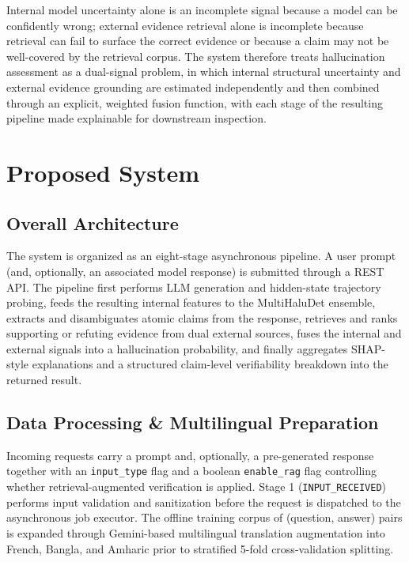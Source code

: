 \documentclass[conference]{IEEEtran}
\begin{document}
Internal model uncertainty alone is an incomplete signal because a model can be confidently wrong; external evidence retrieval alone is incomplete because retrieval can fail to surface the correct evidence or because a claim may not be well-covered by the retrieval corpus. The system therefore treats hallucination assessment as a dual-signal problem, in which internal structural uncertainty and external evidence grounding are estimated independently and then combined through an explicit, weighted fusion function, with each stage of the resulting pipeline made explainable for downstream inspection.

\section{Proposed System}

\subsection{Overall Architecture}
The system is organized as an eight-stage asynchronous pipeline. A user prompt (and, optionally, an associated model response) is submitted through a REST API. The pipeline first performs LLM generation and hidden-state trajectory probing, feeds the resulting internal features to the MultiHaluDet ensemble, extracts and disambiguates atomic claims from the response, retrieves and ranks supporting or refuting evidence from dual external sources, fuses the internal and external signals into a hallucination probability, and finally aggregates SHAP-style explanations and a structured claim-level verifiability breakdown into the returned result.

\subsection{Data Processing \& Multilingual Preparation}
Incoming requests carry a prompt and, optionally, a pre-generated response together with an \texttt{input\_type} flag and a boolean \texttt{enable\_rag} flag controlling whether retrieval-augmented verification is applied. Stage 1 (\texttt{INPUT\_RECEIVED}) performs input validation and sanitization before the request is dispatched to the asynchronous job executor. The offline training corpus of (question, answer) pairs is expanded through Gemini-based multilingual translation augmentation into French, Bangla, and Amharic prior to stratified 5-fold cross-validation splitting.
\end{document}

